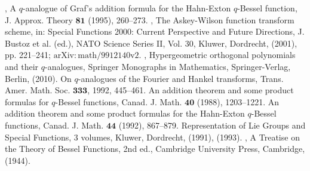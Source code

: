 \documentclass[12pt,a4paper]{amsart}
\numberwithin{equation}{section}
\theoremstyle{plain}
\theoremstyle{definition}
\theoremstyle{remark}
\numberwithin{equation}{section}
\numberwithin{table}{section}
\numberwithin{figure}{section}
\begin{document}
\begin{thebibliography}{99}
, {A $q$-analogue of Graf's addition formula for the Hahn-Exton
$q$-Bessel function}, {J. Approx. Theory $\mathbf{81}$ (1995),
260--273.}
, {The Askey-Wilson function transform scheme, in: Special Functions 2000: Current Perspective and Future Directions, J. Bustoz et al. (ed.), NATO Science Series II, Vol. 30, Kluwer, Dordrecht, (2001), pp. 221--241; $\mathrm{arXiv:math/9912140v2}.$}
,
{ Hypergeometric orthogonal polynomials and their $q$-analogues,
Springer Monographs in Mathematics}, {Springer-Verlag, Berlin,
(2010).}
 { On $q$-analogues of the Fourier and Hankel
transforms,} {Trans. Amer. Math. Soc. $\mathbf{333}$, 1992,
445--461.}
 {An addition theorem and some product formulas for $q$-Bessel functions}, {Canad. J. Math.
$\mathbf{40}$ (1988), 1203--1221.}
 {An addition theorem and some product formulas for the Hahn-Exton $q$-Bessel functions,} {Canad. J. Math. $\mathbf{44}$ (1992), 867--879.}
 {Representation of Lie Groups and Special Functions,} {3 volumes,
Kluwer, Dordrecht, (1991), (1993).}
, {A Treatise on the Theory of Bessel Functions}, {2nd ed., Cambridge University Press,
Cambridge, (1944).}
\end{thebibliography}
\end{document}
